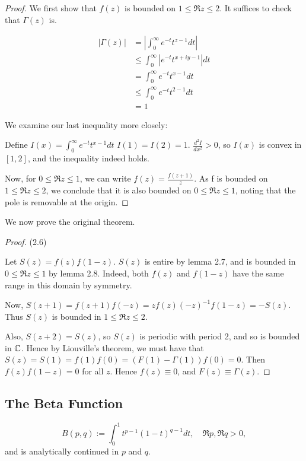 \documentclass[a4paper]{article}
\begin{document}
\begin{proof}
	We first show that $f(z)$ is bounded on $ 1 \le  \Re z \le 2$. It suffices to check that $\Gamma(z)$ is.

	\begin{align*}
		|\Gamma(z)| &= \left| \int_{0}^{\infty} e^{-t}t^{z-1} dt \right| \\
		&\le \int_{0}^{\infty} \left| e^{-t} t^{x+ iy -1} \right| dt \\
		&= \int_{0}^{\infty} e^{-t} t^{x-1} dt \\
		&\le  \int_{0}^{\infty} e^{-t} t^{2-1} dt \\
		&= 1
	\end{align*}

	We examine our last inequality more closely:

	Define $I(x) = \int_{0}^{\infty} e^{-t} t^{x-1} dt$
	$I(1) = I(2) = 1$.  $\frac{d^2 I}{dx^2} > 0 $, so $I(x) $ is convex in $[1,2]$, and the inequality indeed holds.

	Now, for $0\le \Re z \le 1$, we can write $f(z) = \frac{f(z+1)}{z}$. As f is bounded on $1 \le  \Re z \le 2$, we conclude that it is also bounded on $0 \le \Re z \le 1$, noting that the pole is removable at the origin.
\end{proof}

We now prove the original theorem.

\begin{proof} (2.6)

	Let $S(z) = f(z)f(1-z)$. $S(z)$ is entire by lemma 2.7, and is bounded in $0 \le  \Re z \le 1$ by lemma 2.8. Indeed, both $f(z)$ and $f(1-z)$ have the same range in this domain by symmetry.

	Now, $S(z+1) = f(z+1)f(-z) = zf(z) (-z)^{-1} f(1-z) = -S(z)$. Thus $S(z)$ is bounded in $1 \le  \Re z \le  2$.

	Also, $S(z+2) = S(z)$, so $S(z)$ is periodic with period 2, and so is bounded in $\mathbb{C}$. Hence by Liouville's theorem, we must have that $S(z) = S(1) = f(1)f(0) = \left(F(1) - \Gamma(1)\right) f(0) = 0$. Then  $f(z)f(1-z) = 0$ for all $z$. Hence  $f(z) \equiv 0$, and $F(z) \equiv \Gamma(z)$.
	
\end{proof}

\subsection{The Beta Function}

\begin{defn}
	\[
		B(p,q) := \int_0^{1} t^{p-1}(1-t)^{q-1} dt, \quad \Re p, \Re q > 0
	,\]
	and is analytically continued in $p$ and $q$.
\end{defn}
\end{document}
